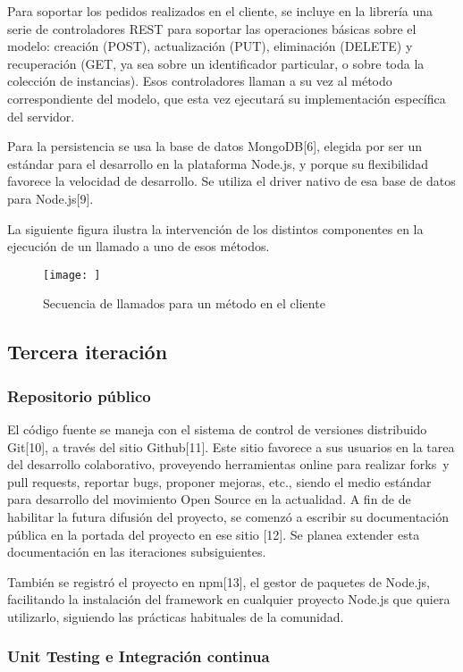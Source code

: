 \documentclass[doc,helv,longtable]{article}
\begin{document}
Para soportar los pedidos realizados en el cliente, se incluye en la librería una serie de controladores REST para soportar las operaciones básicas sobre el modelo: creación (POST), actualización (PUT), eliminación (DELETE) y recuperación (GET, ya sea sobre un identificador particular, o sobre toda la colección de instancias). Esos controladores llaman a su vez al método correspondiente del modelo, que esta vez ejecutará su implementación específica del servidor.

Para la persistencia se usa la base de datos MongoDB[6], elegida por ser un estándar para el desarrollo en la plataforma Node.js, y porque su flexibilidad favorece la velocidad de desarrollo. Se utiliza el driver nativo de esa base de datos para Node.js[9].

La siguiente figura ilustra la intervención de los distintos componentes en la ejecución de un llamado a uno de esos métodos.

\begin{figure}[tb]
\begin{center}
\texttt{[image: ]}
\caption{Secuencia de llamados para un método en el cliente}

\end{center}
\end{figure}

\subsection{Tercera iteración}
\subsubsection{Repositorio público}
El código fuente se maneja con el sistema de control de versiones distribuido Git[10], a través del sitio Github[11]. Este sitio favorece a sus usuarios en la tarea del desarrollo colaborativo, proveyendo herramientas online para realizar forks y pull requests, reportar bugs, proponer mejoras, etc., siendo el medio estándar para desarrollo del movimiento Open Source en la actualidad. A fin de de habilitar la futura difusión del proyecto, se comenzó a escribir su documentación pública en la portada del proyecto en ese sitio [12]. Se planea extender esta documentación en las iteraciones subsiguientes.

También se registró el proyecto en npm[13], el gestor de paquetes de Node.js, facilitando la instalación del framework en cualquier proyecto Node.js que quiera utilizarlo, siguiendo las prácticas habituales de la comunidad.\subsubsection{Unit Testing e Integración continua}
\end{document}
